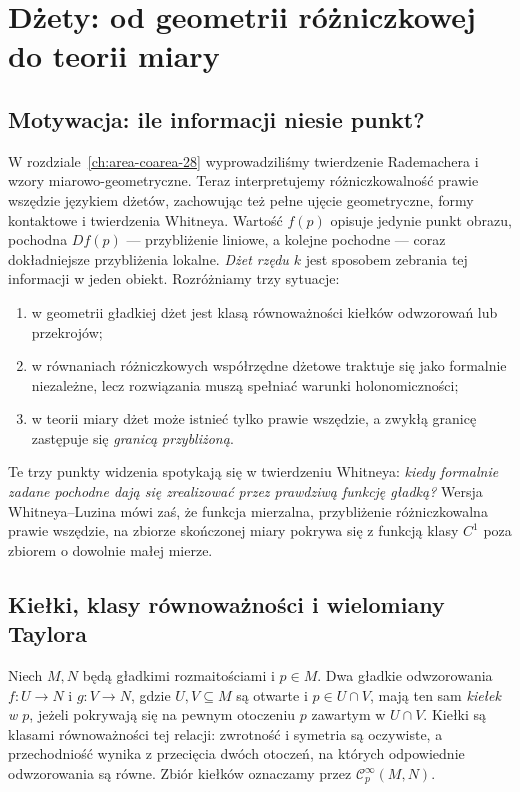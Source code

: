 \chapter{Dżety: od geometrii różniczkowej do teorii miary}
\label{ch:dzety}

\providecommand{\atlasref}[2]{#2}


\section{Motywacja: ile informacji niesie punkt?}
W rozdziale~\ref{ch:area-coarea-28} wyprowadziliśmy twierdzenie
Rademachera i wzory miarowo-geometryczne. Teraz interpretujemy
różniczkowalność prawie wszędzie językiem dżetów, zachowując też
pełne ujęcie geometryczne, formy kontaktowe i twierdzenia Whitneya.
Wartość $f(p)$ opisuje jedynie punkt obrazu, pochodna $Df(p)$ ---
przybliżenie liniowe, a kolejne pochodne --- coraz dokładniejsze
przybliżenia lokalne. \emph{Dżet rzędu $k$} jest sposobem zebrania
tej informacji w jeden obiekt. Rozróżniamy trzy sytuacje:
\begin{enumerate}
\item w geometrii gładkiej dżet jest klasą równoważności
kiełków odwzorowań lub przekrojów;
\item w równaniach różniczkowych współrzędne dżetowe
traktuje się jako formalnie niezależne, lecz rozwiązania
muszą spełniać warunki holonomiczności;
\item w teorii miary dżet może istnieć tylko prawie wszędzie,
a zwykłą granicę zastępuje się \emph{granicą przybliżoną}.
\end{enumerate}
Te trzy punkty widzenia spotykają się w twierdzeniu Whitneya:
\emph{kiedy formalnie zadane pochodne dają się zrealizować przez
prawdziwą funkcję gładką?} Wersja Whitneya--Luzina mówi zaś, że funkcja
mierzalna, przybliżenie różniczkowalna prawie wszędzie,
na zbiorze skończonej miary pokrywa się z funkcją klasy
$C^1$ poza zbiorem o dowolnie małej mierze.

\section{Kiełki, klasy równoważności i wielomiany Taylora}
\begin{definicja}
\label{def:dzety-kielek}
Niech $M,N$ będą gładkimi rozmaitościami i $p\in M$.
Dwa gładkie odwzorowania $f:U\to N$ i $g:V\to N$,
gdzie $U,V\subseteq M$ są otwarte i $p\in U\cap V$,
mają ten sam \emph{kiełek w $p$},
jeżeli pokrywają się na pewnym otoczeniu $p$ zawartym w $U\cap V$.
Kiełki są klasami równoważności tej relacji:
zwrotność i symetria są oczywiste, a przechodniość
wynika z przecięcia dwóch otoczeń, na których
odpowiednie odwzorowania są równe.
Zbiór kiełków oznaczamy przez $\mathcal C^\infty_p(M,N)$.
\end{definicja}

